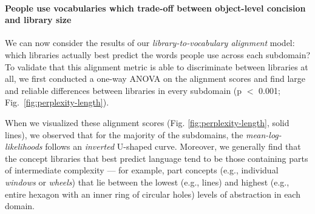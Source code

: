 \documentclass[10pt,letterpaper]{article}
\begin{document}


\paragraph{People use vocabularies which trade-off between object-level concision and library size}
We can now consider the results of our \textit{library-to-vocabulary alignment} model: which libraries actually best predict the words people use across each subdomain? 
To validate that this alignment metric is able to discriminate between libraries at all, we first conducted a one-way ANOVA on the alignment scores and find large and reliable differences between libraries in every subdomain (p $<$ 0.001; Fig.~\ref{fig:perplexity-length}).

When we visualized these alignment scores (Fig. \ref{fig:perplexity-length}, solid lines), we observed that for the majority of the subdomains, the \textit{mean-log-likelihoods} follows an \textit{inverted} U-shaped curve.
Moreover, we generally find that the concept libraries that best predict language tend to be those containing parts of intermediate complexity --- for example, part concepts (e.g., individual \textit{windows} or \textit{wheels}) that lie between the lowest (e.g., lines) and highest (e.g., entire hexagon with an inner ring of circular holes) levels of abstraction in each domain.
\end{document}
